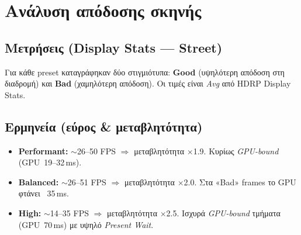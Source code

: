 \section{Ανάλυση απόδοσης σκηνής}
\subsection*{Μετρήσεις (Display Stats — Street)}
Για κάθε preset καταγράφηκαν δύο στιγμιότυπα: \textbf{Good} (υψηλότερη απόδοση στη διαδρομή) και \textbf{Bad} (χαμηλότερη απόδοση). Οι τιμές είναι \emph{Avg} από HDRP Display Stats.

\begin{table}[H]
  \noindent
\end{table}

\subsection*{Ερμηνεία (εύρος \& μεταβλητότητα)}
\begin{itemize}
  \item \textbf{Performant:} \(\sim\)26–50 FPS \(\Rightarrow\) μεταβλητότητα \(\times\)1.9. Κυρίως \textit{GPU-bound} (GPU~19–32\,ms).
  \item \textbf{Balanced:} \(\sim\)26–51 FPS \(\Rightarrow\) μεταβλητότητα \(\times\)2.0. Στα «Bad» frames το GPU φτάνει ~35\,ms.
  \item \textbf{High:} \(\sim\)14–35 FPS \(\Rightarrow\) μεταβλητότητα \(\times\)2.5. Ισχυρά \textit{GPU-bound} τμήματα (GPU~70\,ms) με υψηλό \textit{Present Wait}.
\end{itemize}

